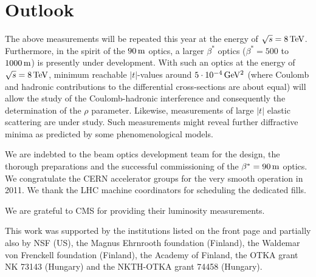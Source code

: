 \documentclass[doublecol]{epl/epl2}
\def\un#1{\,{\rm #1}}
\begin{document}
\section{Outlook}

The above measurements will be repeated this year at the energy of $\sqrt s = 8\un{TeV}$. Furthermore, in the spirit of the $90\un{m}$ optics, a larger $\beta^*$ optics ($\beta^* = 500$ to $1000\un{m}$) is presently under development. With such an optics at the energy of $\sqrt s = 8\un{TeV}$, minimum reachable $|t|$-values around  $5\cdot 10^{-4}\un{GeV^2}$ (where Coulomb and hadronic contributions to the differential cross-sections are about equal) will allow the study of the Coulomb-hadronic interference and consequently the determination of the $\rho$ parameter. Likewise, measurements of large $|t|$ elastic scattering are under study. Such measurements might reveal further diffractive minima as predicted by some phenomenological models.



\acknowledgments

We are indebted to the beam optics development team
for the design, the thorough preparations and the successful commissioning of the $\beta^* = 90\un{m}$ optics. We congratulate the CERN accelerator groups for the very smooth operation in 2011. We thank
the LHC machine coordinators for scheduling the dedicated fills.

We are grateful to CMS for providing their luminosity measurements.

This work was supported by the institutions listed on the front page and partially also by NSF (US), the Magnus
Ehrnrooth foundation (Finland), the Waldemar von Frenckell foundation (Finland), the Academy of
Finland, the OTKA grant NK 73143 (Hungary) and the NKTH-OTKA grant 74458 (Hungary).
\end{document}
